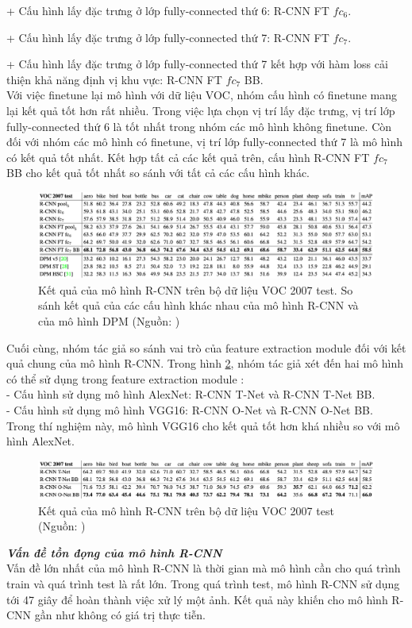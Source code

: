 {    + Cấu hình lấy đặc trưng ở lớp fully-connected thứ 6: R-CNN FT ${fc}_{6}$. \par
    + Cấu hình lấy đặc trưng ở lớp fully-connected thứ 7: R-CNN FT ${fc}_{7}$. \par
    + Cấu hình lấy đặc trưng ở lớp fully-connected thứ 7 kết hợp với hàm loss cải thiện khả năng định vị khu vực: R-CNN FT ${fc}_{7}$ BB. \\
    Với việc finetune lại mô hình với dữ liệu VOC, nhóm cấu hình có finetune mang lại kết quả tốt hơn rất nhiều.
    Trong việc lựa chọn vị trí lấy đặc trưng, vị trí lớp fully-connected thứ 6 là tốt nhất trong nhóm các mô hình không finetune.
    Còn đối với nhóm các mô hình có finetune, vị trí lớp fully-connected thứ 7 là mô hình có kết quả tốt nhất.
    Kết hợp tất cả các kết quả trên, cấu hình R-CNN FT ${fc}_{7}$ BB cho kết quả tốt nhất so sánh với tất cả các cấu hình khác.
    \begin{figure}[H]
        \centering
        \includegraphics[width=15cm] {images/rcnn_results_1}
        \caption{Kết quả của mô hình R-CNN trên bộ dữ liệu VOC 2007 test. So sánh kết quả của các cấu hình khác nhau của mô hình R-CNN và của mô hình DPM (Nguồn: \cite{girshick2014rich})}
        \label{fig:rcnn_results_1}
    \end{figure}
    \noindent
    Cuối cùng, nhóm tác giả so sánh vai trò của feature extraction module  đối với kết quả chung của mô hình R-CNN.
    Trong hình \ref{fig:rcnn_results_2}, nhóm tác giả xét đến hai mô hình có thể sử dụng trong feature extraction module : \\
    - Cấu hình sử dụng mô hình AlexNet: R-CNN T-Net và R-CNN T-Net BB. \\
    - Cấu hình sử dụng mô hình VGG16: R-CNN O-Net và R-CNN O-Net BB. \\
    Trong thí nghiệm này, mô hình VGG16 cho kết quả tốt hơn khá nhiều so với mô hình AlexNet.
    \begin{figure}[H]
        \centering
        \includegraphics[width=15cm] {images/rcnn_results_2}
        \caption{Kết quả của mô hình R-CNN trên bộ dữ liệu VOC 2007 test (Nguồn: \cite{girshick2014rich})}
        \label{fig:rcnn_results_2}
    \end{figure}

    \noindent
    \textbf{\textit{Vấn đề tồn đọng của mô hình R-CNN}} \\
    Vấn đề lớn nhất của mô hình R-CNN là thời gian mà mô hình cần cho quá trình train và quá trình test là rất lớn.
    Trong quá trình test, mô hình R-CNN sử dụng tới 47 giây để hoàn thành việc xử lý một ảnh.
    Kết quả này khiến cho mô hình R-CNN gần như không có giá trị thực tiễn.
}
